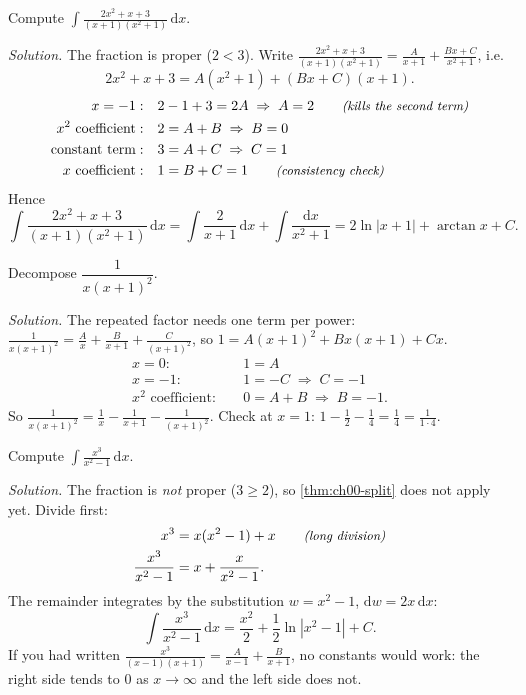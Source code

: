 \begin{example}\label{ex:ch00-pf1}
Compute $\displaystyle\int\frac{2x^2 + x + 3}{(x+1)(x^2+1)}\,\mathrm{d}x$.

\emph{Solution.} The fraction is proper ($2<3$). Write
$\frac{2x^2+x+3}{(x+1)(x^2+1)} = \frac{A}{x+1} + \frac{Bx+C}{x^2+1}$, i.e.
\[
  2x^2 + x + 3 = A(x^2+1) + (Bx+C)(x+1).
\]
\begin{align*}
  x=-1:&\quad 2 - 1 + 3 = 2A \;\Rightarrow\; A = 2 \qquad\text{\small\itshape(kills the second term)}\\
  x^2\text{ coefficient}:&\quad 2 = A + B \;\Rightarrow\; B = 0\\
  \text{constant term}:&\quad 3 = A + C \;\Rightarrow\; C = 1\\
  x\text{ coefficient}:&\quad 1 = B + C = 1 \qquad\text{\small\itshape(consistency check)}
\end{align*}
Hence
\[
  \int\frac{2x^2+x+3}{(x+1)(x^2+1)}\,\mathrm{d}x
  = \int\frac{2}{x+1}\,\mathrm{d}x + \int\frac{\mathrm{d}x}{x^2+1}
  = 2\ln|x+1| + \arctan x + C .
\]
\end{example}

\begin{example}\label{ex:ch00-pf-repeated}
Decompose $\dfrac{1}{x(x+1)^2}$.

\emph{Solution.} The repeated factor needs one term per power:
$\frac{1}{x(x+1)^2} = \frac{A}{x} + \frac{B}{x+1} + \frac{C}{(x+1)^2}$, so
$1 = A(x+1)^2 + Bx(x+1) + Cx$.
\begin{align*}
  x = 0:&\quad 1 = A \\
  x = -1:&\quad 1 = -C \;\Rightarrow\; C = -1\\
  x^2\text{ coefficient}:&\quad 0 = A + B \;\Rightarrow\; B = -1 .
\end{align*}
So $\frac{1}{x(x+1)^2} = \frac1x - \frac{1}{x+1} - \frac{1}{(x+1)^2}$.
Check at $x=1$: $1 - \frac12 - \frac14 = \frac14 = \frac{1}{1\cdot 4}$.
\end{example}

\begin{example}\label{ex:ch00-improper}
Compute $\displaystyle\int\frac{x^3}{x^2-1}\,\mathrm{d}x$.

\emph{Solution.} The fraction is \emph{not} proper ($3 \ge 2$), so
\cref{thm:ch00-split} does not apply yet. Divide first:
\begin{align*}
  x^3 &= x(x^2-1) + x \qquad\text{\small\itshape(long division)}\\
  \frac{x^3}{x^2-1} &= x + \frac{x}{x^2-1}.
\end{align*}
The remainder integrates by the substitution $w = x^2-1$,
$\mathrm{d}w = 2x\,\mathrm{d}x$:
\[
  \int\frac{x^3}{x^2-1}\,\mathrm{d}x = \frac{x^2}{2} + \frac12\ln|x^2-1| + C .
\]
If you had written $\frac{x^3}{(x-1)(x+1)} = \frac{A}{x-1} + \frac{B}{x+1}$,
no constants would work: the right side tends to $0$ as $x\to\infty$ and the
left side does not.
\end{example}

